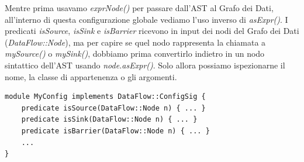 Mentre prima usavamo \textit{exprNode()} per passare dall'AST al Grafo dei Dati, 
all'interno di questa configurazione globale vediamo l'uso inverso di \textit{asExpr()}. 
I predicati \textit{isSource}, \textit{isSink} e \textit{isBarrier} ricevono in input 
dei nodi del Grafo dei Dati (\textit{DataFlow::Node}), ma per capire se quel nodo 
rappresenta la chiamata a \textit{mySource()} o \textit{mySink()}, dobbiamo prima 
convertirlo indietro in un nodo sintattico dell'AST usando \textit{node.asExpr()}. 
Solo allora possiamo ispezionarne il nome, la classe di appartenenza o gli argomenti.

\begin{lstlisting}
module MyConfig implements DataFlow::ConfigSig {
    predicate isSource(DataFlow::Node n) { ... }
    predicate isSink(DataFlow::Node n) { ... }
    predicate isBarrier(DataFlow::Node n) { ... }
    ...
}
\end{lstlisting}